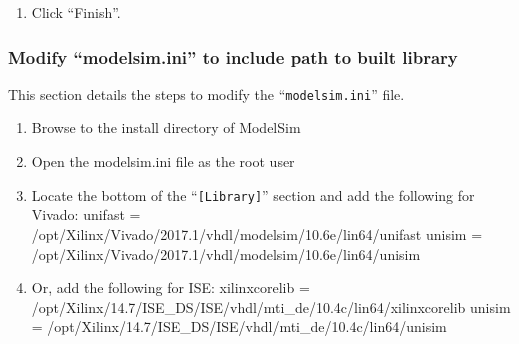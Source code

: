 \begin{flushleft}
\begin{flushleft}
\begin{enumerate}
		\item Click ``Finish''.
	\end{enumerate}

\newpage

\end{flushleft}

\subsubsection{Modify ``modelsim.ini'' to include path to built library}
	This section details the steps to modify the ``\texttt{modelsim.ini}'' file.

	\begin{enumerate}
		\item Browse to the install directory of ModelSim
			\subitem {}
		\item Open the modelsim.ini file as the root user
			\subitem {}
		\item Locate the bottom of the ``\texttt{[Library]}'' section and add the following for Vivado:
			\subitem unifast = /opt/Xilinx/Vivado/2017.1/vhdl/modelsim/10.6e/lin64/unifast
			\subitem unisim = /opt/Xilinx/Vivado/2017.1/vhdl/modelsim/10.6e/lin64/unisim
		\item Or, add the following for ISE:
			\subitem xilinxcorelib = /opt/Xilinx/14.7/ISE\_DS/ISE/vhdl/mti\_de/10.4c/lin64/xilinxcorelib
			\subitem unisim = /opt/Xilinx/14.7/ISE\_DS/ISE/vhdl/mti\_de/10.4c/lin64/unisim

	\end{enumerate}

\end{flushleft}


